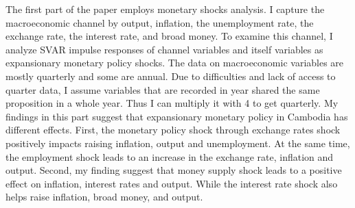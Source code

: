 \documentclass[11pt,letterpaper]{article}
\begin{document}
The first part of the paper employs monetary shocks analysis. I capture the macroeconomic channel by output, inflation, the unemployment rate, the exchange rate, the interest rate, and broad money. To examine this channel, I analyze SVAR impulse responses of channel variables and itself variables as expansionary monetary policy shocks. The data on macroeconomic variables are mostly quarterly and some are annual. Due to difficulties and lack of access to quarter data, I assume variables that are recorded in year shared the same proposition in a whole year. Thus I can multiply it with 4 to get quarterly. My findings in this part suggest that expansionary monetary policy in Cambodia has different effects. First, the monetary policy shock through exchange rates shock positively impacts raising inflation, output and unemployment. At the same time, the employment shock leads to an increase in the exchange rate, inflation and output. Second, my finding suggest that money supply shock leads to a positive effect on inflation, interest rates and output. While the interest rate shock also helps raise inflation, broad money, and output. 
\end{document}
